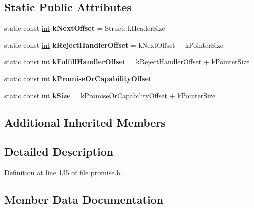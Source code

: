 \subsection*{Static Public Attributes}
\begin{DoxyCompactItemize}
\item 
\mbox{\label{classv8_1_1internal_1_1PromiseReaction_aaa0dae341c2ee730e78d8faee04282ac}} 
static const \mbox{\hyperlink{classint}{int}} {\bfseries k\+Next\+Offset} = Struct\+::k\+Header\+Size
\item 
\mbox{\label{classv8_1_1internal_1_1PromiseReaction_a0c81c30a1b6dbefb4ebc927b9cbd8764}} 
static const \mbox{\hyperlink{classint}{int}} {\bfseries k\+Reject\+Handler\+Offset} = k\+Next\+Offset + k\+Pointer\+Size
\item 
\mbox{\label{classv8_1_1internal_1_1PromiseReaction_a5da1c973b7cd2ac8b61951080c7942ee}} 
static const \mbox{\hyperlink{classint}{int}} {\bfseries k\+Fulfill\+Handler\+Offset} = k\+Reject\+Handler\+Offset + k\+Pointer\+Size
\item 
static const \mbox{\hyperlink{classint}{int}} {\bfseries k\+Promise\+Or\+Capability\+Offset}
\item 
\mbox{\label{classv8_1_1internal_1_1PromiseReaction_a625f74e9be75e0c4cf4aaaa3352a97ed}} 
static const \mbox{\hyperlink{classint}{int}} {\bfseries k\+Size} = k\+Promise\+Or\+Capability\+Offset + k\+Pointer\+Size
\end{DoxyCompactItemize}
\subsection*{Additional Inherited Members}


\subsection{Detailed Description}


Definition at line 135 of file promise.\+h.



\subsection{Member Data Documentation}
\mbox{\label{classv8_1_1internal_1_1PromiseReaction_af5a6bec56002beffa66e1346aa714209}} 
